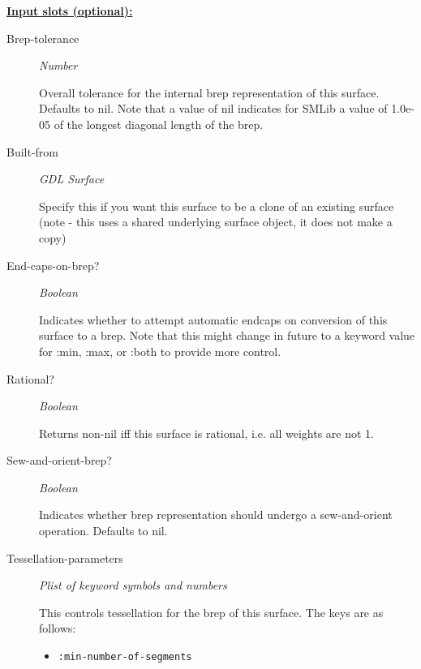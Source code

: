 \documentclass [11pt]{book}
\begin{document}
\begin{itemize}
\textbf{
\underline{Input slots (optional):}}

\begin{description}

\item [Brep-tolerance]
\emph{Number}

 Overall tolerance for the internal brep representation of this surface.
Defaults to nil. Note that a value of nil indicates for SMLib a value of 1.0e-05 of
the longest diagonal length of the brep.




\item [Built-from]
\emph{GDL Surface}

 Specify this if you want this surface to be a
clone of an existing surface (note - this uses a shared underlying
surface object, it does not make a copy)




\item [End-caps-on-brep?]
\emph{Boolean}

 Indicates whether to attempt automatic endcaps on conversion
of this surface to a brep.
Note that this might change in future to a keyword value
for :min, :max, or :both to provide more control.




\item [Rational?]
\emph{Boolean}

 Returns non-nil iff this surface is rational, i.e. all weights are not 1.




\item [Sew-and-orient-brep?]
\emph{Boolean}

 Indicates whether brep representation should undergo a
sew-and-orient operation. Defaults to nil.




\item [Tessellation-parameters]
\emph{Plist of keyword symbols and numbers}

 This controls tessellation for the brep of this surface.
The keys are as follows:


\begin{itemize}

\item \texttt{:min-number-of-segments}



\end{itemize}
\end{description}
\end{itemize}
\end{document}
